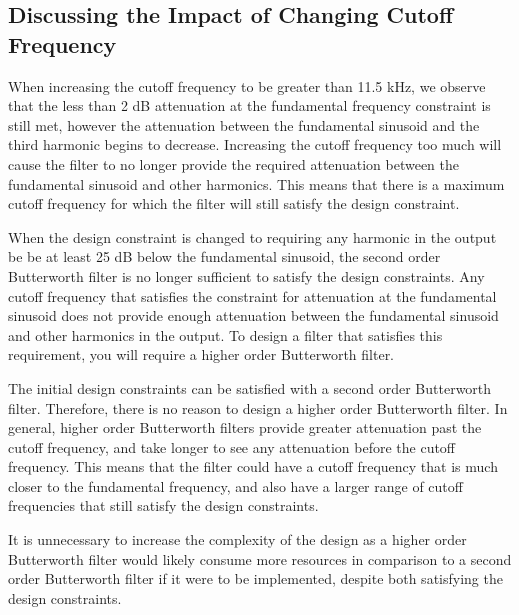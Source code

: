 \documentclass[12pt]{article}
\begin{document}
\subsection*{Discussing the Impact of Changing Cutoff Frequency}
When increasing the cutoff frequency to be greater than 11.5 kHz, we observe that the less than 2 dB attenuation at the fundamental frequency constraint is still met, however the attenuation between the fundamental sinusoid and the third harmonic begins to decrease. Increasing the cutoff frequency too much will cause the filter to no longer provide the required attenuation between the fundamental sinusoid and other harmonics. This means that there is a maximum cutoff frequency for which the filter will still satisfy the design constraint.

When the design constraint is changed to requiring any harmonic in the output be be at least 25 dB below the fundamental sinusoid, the second order Butterworth filter is no longer sufficient to satisfy the design constraints. Any cutoff frequency that satisfies the constraint for attenuation at the fundamental sinusoid does not provide enough attenuation between the fundamental sinusoid and other harmonics in the output. To design a filter that satisfies this requirement, you will require a higher order Butterworth filter.

The initial design constraints can be satisfied with a second order Butterworth filter. Therefore, there is no reason to design a higher order Butterworth filter. In general, higher order Butterworth filters provide greater attenuation past the cutoff frequency, and take longer to see any attenuation before the cutoff frequency. This means that the filter could have a cutoff frequency that is much closer to the fundamental frequency, and also have a larger range of cutoff frequencies that still satisfy the design constraints. 

It is unnecessary to increase the complexity of the design as a higher order Butterworth filter would likely consume more resources in comparison to a second order Butterworth filter if it were to be implemented, despite both satisfying the design constraints.

\end{document}
